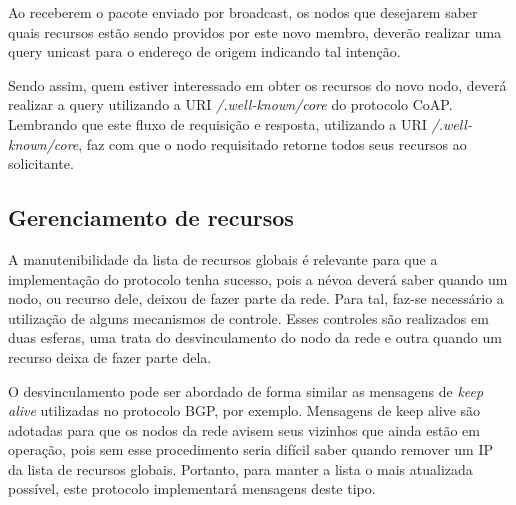 Ao receberem o pacote enviado por broadcast, os nodos que desejarem saber quais recursos estão sendo providos por este novo membro, deverão realizar uma query
unicast para o endereço de origem indicando tal intenção.

Sendo assim, quem estiver interessado em obter os recursos do novo nodo, deverá realizar a query utilizando a URI \textit{/.well-known/core} do protocolo CoAP.
Lembrando que este fluxo de requisição e resposta, utilizando a URI \textit{/.well-known/core}, faz com que o nodo requisitado retorne todos seus recursos ao solicitante.


\subsection{Gerenciamento de recursos}

A manutenibilidade da lista de recursos globais é relevante para que a implementação do protocolo tenha sucesso, pois a névoa deverá saber quando um nodo, ou recurso dele, deixou de fazer parte da rede.
Para tal, faz-se necessário a utilização de alguns mecanismos de controle.
Esses controles são realizados em duas esferas, uma trata do desvinculamento do nodo da rede e outra quando um recurso deixa de fazer parte dela.

O desvinculamento pode ser abordado de forma similar as mensagens de \textit{keep alive} utilizadas no protocolo BGP, por exemplo.
Mensagens de keep alive são adotadas para que os nodos da rede avisem seus vizinhos que ainda estão em operação, pois sem esse procedimento seria difícil
saber quando remover um IP da lista de recursos globais. Portanto, para manter a lista o mais atualizada possível, este protocolo implementará mensagens deste tipo.









